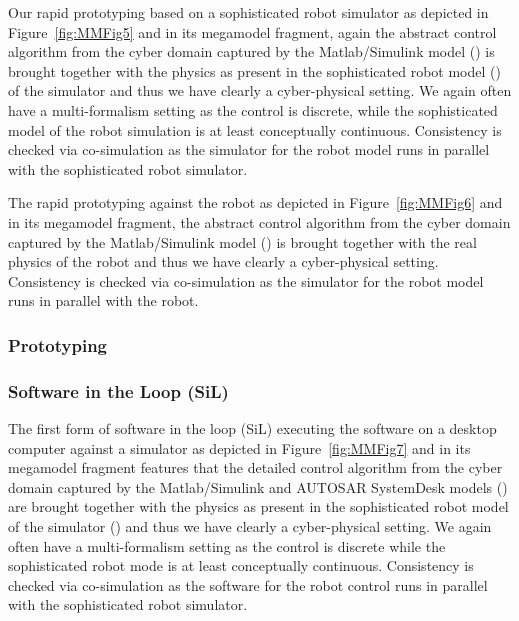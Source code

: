 %
Our rapid prototyping based on a sophisticated robot simulator as depicted in Figure~\ref{fig:MMFig5} and in its megamodel fragment, again the abstract control algorithm from the cyber domain captured by the Matlab/Simulink model (\CPSLabControlModel) is brought together with the physics as present in the sophisticated robot model (\CPSLabRobotModel) of the simulator and thus we have clearly a cyber-physical setting. We again often have a multi-formalism setting as the control is discrete, while the sophisticated model of the robot simulation is at least conceptually continuous. Consistency is checked via co-simulation as the simulator for the robot model runs in parallel with the sophisticated robot simulator.

The rapid prototyping against the robot as depicted in Figure~\ref{fig:MMFig6} and in its megamodel fragment, the abstract control algorithm from the cyber domain captured by the Matlab/Simulink model (\CPSLabControlModel) is brought together with the real physics of the robot  and thus we have clearly a cyber-physical setting. Consistency is checked via co-simulation as the simulator for the robot model runs in parallel with the robot.



\subsubsection{Prototyping}
%

\subsubsection{Software in the Loop (SiL)}
%
The first form of software in the loop (SiL) executing the software on a desktop computer against a simulator as depicted in Figure~\ref{fig:MMFig7} and in its megamodel fragment features that the detailed control algorithm from the cyber domain captured by the Matlab/Simulink and AUTOSAR SystemDesk models (\CPSLabSystemModels) are brought together with the physics as present in the sophisticated robot model of the simulator (\CPSLabRobotModel) and thus we have clearly a cyber-physical setting. We again often have a multi-formalism setting as the control is discrete while the sophisticated robot mode is at least conceptually continuous. Consistency is checked via co-simulation as the software for the robot control runs in parallel with the sophisticated robot simulator.


